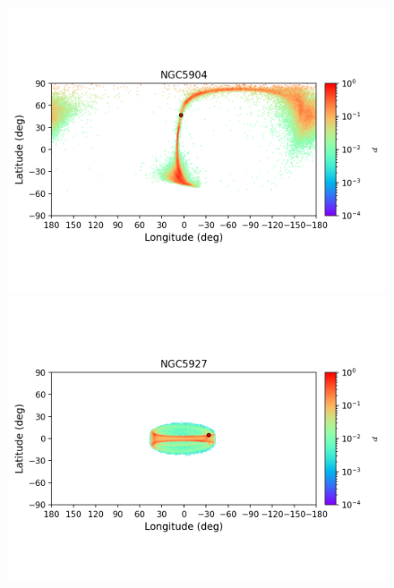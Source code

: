         \begin{figure}
            \begin{center}
                \includegraphics[clip=true, trim = 0mm 20mm 0mm 10mm, width=1\columnwidth]{images/error_plots_NGC5904.png}
                \includegraphics[clip=true, trim = 0mm 20mm 0mm 10mm, width=1\columnwidth]{images/error_plots_NGC5927.png}
                

\end{center}
\end{figure}

